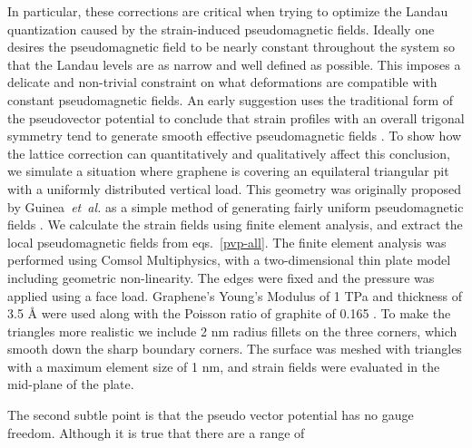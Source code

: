 In particular, these corrections are critical when trying to optimize the Landau quantization caused by the strain-induced pseudomagnetic fields.
Ideally one desires the pseudomagnetic field to be nearly constant throughout the system so that the Landau levels are as narrow and well defined as possible.
This imposes a delicate and non-trivial constraint on what deformations are compatible with constant pseudomagnetic fields.
An early suggestion uses the traditional form of the pseudovector potential to conclude that strain profiles with an overall trigonal symmetry tend to generate smooth effective pseudomagnetic fields \cite{Guinea2009}.
To show how the lattice correction can quantitatively and qualitatively affect this conclusion, we simulate a situation where graphene is covering an equilateral triangular pit with a uniformly distributed vertical load.
This geometry was originally proposed by Guinea~\emph{et~al.} as a simple method of generating fairly uniform pseudomagnetic fields \cite{Guinea2009}.
We calculate the strain fields using finite element analysis, and extract the local pseudomagnetic fields from eqs.~\eqref{pvp-all}.
The finite element analysis was performed using Comsol Multiphysics, with a two-dimensional thin plate model including geometric non-linearity.
The edges were fixed and the pressure was applied using a face load.
Graphene's Young's Modulus of 1 TPa and thickness of 3.5 \AA \cite{Lee2008} were used along with the Poisson ratio of graphite of 0.165 \cite{Blakslee1970}.
To make the triangles more realistic we include 2 nm radius fillets on the three corners, which smooth down the sharp boundary corners.
The surface was meshed with triangles with a maximum element size of 1 nm, and strain fields were evaluated in the mid-plane of the plate.

The second subtle point is that the pseudo vector potential has no gauge freedom.
Although it is true that there are a range of 

